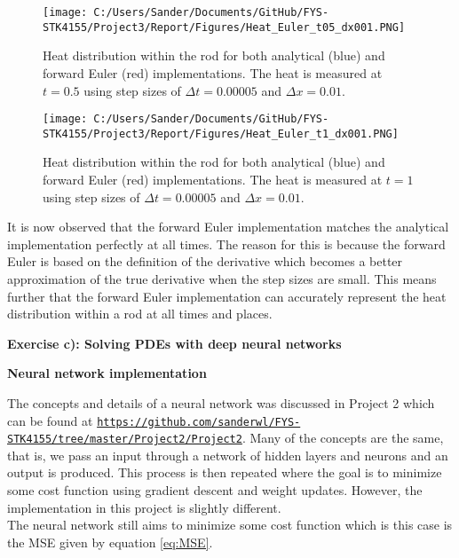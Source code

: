 \documentclass[12pt,a4paper]{article}
\begin{document}
\begin{figure}[H]
\centering
\texttt{[image: C:/Users/Sander/Documents/GitHub/FYS-STK4155/Project3/Report/Figures/Heat\_Euler\_t05\_dx001.PNG]}
\caption{\label{fig:rodHeatEulerT05DX001} Heat distribution within the rod for both analytical (blue) and forward Euler (red) implementations. The heat is measured at $t = 0.5$ using step sizes of $\Delta t = 0.00005$ and $\Delta x = 0.01$.}
\end{figure}

\begin{figure}[H]
\centering
\texttt{[image: C:/Users/Sander/Documents/GitHub/FYS-STK4155/Project3/Report/Figures/Heat\_Euler\_t1\_dx001.PNG]}
\caption{\label{fig:rodHeatEulerT1DX001} Heat distribution within the rod for both analytical (blue) and forward Euler (red) implementations. The heat is measured at $t = 1$ using step sizes of $\Delta t = 0.00005$ and $\Delta x = 0.01$.}
\end{figure}

\noindent It is now observed that the forward Euler implementation matches the analytical implementation perfectly at all times. The reason for this is because the forward Euler is based on the definition of the derivative which becomes a better approximation of the true derivative when the step sizes are small. This means further that the forward Euler implementation can accurately represent the heat distribution within a rod at all times and places.

\newpage

\begin{center}
\Large{\textbf{Exercise c): Solving PDEs with deep neural networks}}
\end{center}

\begin{center}
\large{\textbf{Neural network implementation}}
\end{center}

\noindent The concepts and details of a neural network was discussed in Project 2 which can be found at \href{{https://github.com/sanderwl/FYS-STK4155/tree/master/Project2/Project2}}{\nolinkurl{https://github.com/sanderwl/FYS-STK4155/tree/master/Project2/Project2}}. Many of the concepts are the same, that is, we pass an input through a network of hidden layers and neurons and an output is produced. This process is then repeated where the goal is to minimize some cost function using gradient descent and weight updates. However, the implementation in this project is slightly different. 
\\
The neural network still aims to minimize some cost function which is this case is the MSE given by equation \ref{eq:MSE}.
\end{document}
